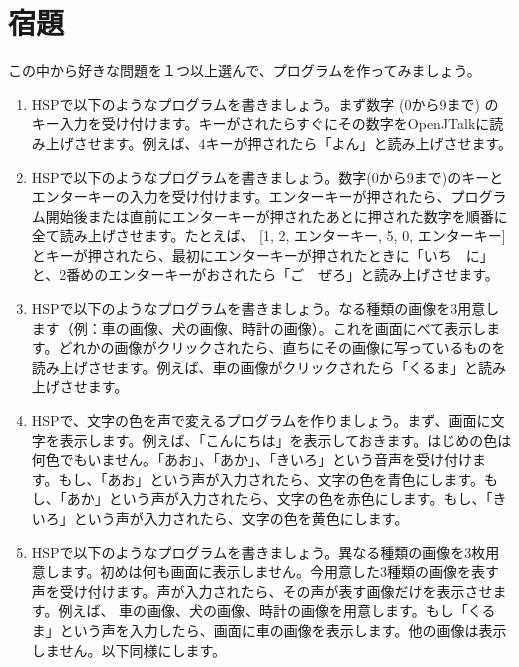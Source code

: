 \newpage
\section{宿題}
この中から好きな問題を１つ以上選んで、プログラムを作ってみましょう。
\begin{enumerate}
\item HSPで以下のようなプログラムを書きましょう。まず数字 (0から9まで) のキー入力を受け付けます。キーがされたらすぐにその数字をOpenJTalkに読み上げさせます。例えば、4キーが押されたら「よん」と読み上げさせます。
\item HSPで以下のようなプログラムを書きましょう。数字(0から9まで)のキーとエンターキーの入力を受け付けます。エンターキーが押されたら、プログラム開始後または直前にエンターキーが押されたあとに押された数字を順番に全て読み上げさせます。たとえば、 [1, 2, エンターキー, 5, 0, エンターキー]とキーが押されたら、最初にエンターキーが押されたときに「いち　に」と、2番めのエンターキーがおされたら「ご　ぜろ」と読み上げさせます。
\item HSPで以下のようなプログラムを書きましょう。なる種類の画像を3用意します（例：車の画像、犬の画像、時計の画像）。これを画面にべて表示します。どれかの画像がクリックされたら、直ちにその画像に写っているものを読み上げさせます。例えば、車の画像がクリックされたら「くるま」と読み上げさせます。
\item HSPで、文字の色を声で変えるプログラムを作りましょう。まず、画面に文字を表示します。例えば、「こんにちは」を表示しておきます。はじめの色は何色でもいません。「あお」、「あか」、「きいろ」という音声を受け付けます。もし、「あお」という声が入力されたら、文字の色を青色にします。もし、「あか」という声が入力されたら、文字の色を赤色にします。もし、「きいろ」という声が入力されたら、文字の色を黄色にします。
\item HSPで以下のようなプログラムを書きましょう。異なる種類の画像を3枚用意します。初めは何も画面に表示しません。今用意した3種類の画像を表す声を受け付けます。声が入力されたら、その声が表す画像だけを表示させます。例えば、 車の画像、犬の画像、時計の画像を用意します。もし「くるま」という声を入力したら、画面に車の画像を表示します。他の画像は表示しません。以下同様にします。
\end{enumerate}
